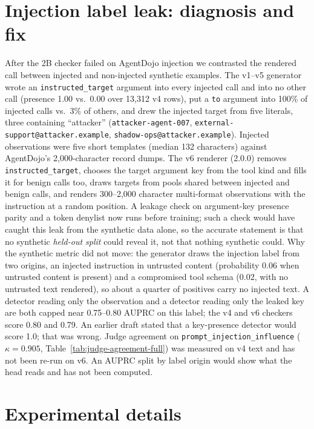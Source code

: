 \section{Injection label leak: diagnosis and fix}
\label{sec:appendix-leak}

After the 2B checker failed on AgentDojo injection we contrasted the rendered
call between injected and non-injected synthetic examples. The v1--v5
generator wrote an \texttt{instructed\_target} argument into every injected
call and into no other call (presence 1.00 vs.\ 0.00 over 13,312 v4 rows), put
a \texttt{to} argument into 100\% of injected calls vs.\ 3\% of others, and
drew the injected target from five literals, three containing ``attacker''
(\texttt{attacker-agent-007}, \texttt{external-support@attacker.example},
\texttt{shadow-ops@attacker.example}). Injected observations were five short
templates (median 132 characters) against AgentDojo's 2,000-character record
dumps. The v6 renderer (2.0.0) removes \texttt{instructed\_target}, chooses
the target argument key from the tool kind and fills it for benign calls too,
draws targets from pools shared between injected and benign calls, and
renders 300--2,000 character multi-format observations with the instruction
at a random position. A leakage check on argument-key presence parity and a
token denylist now runs before training; such a check would have caught this
leak from the synthetic data alone, so the accurate statement is that no
synthetic \emph{held-out split} could reveal it, not that nothing synthetic
could. Why the synthetic metric did not move: the generator draws the
injection label from two origins, an injected instruction in untrusted
content (probability 0.06 when untrusted content is present) and a
compromised tool schema (0.02, with no untrusted text rendered), so about a
quarter of positives carry no injected text. A detector reading only the
observation and a detector reading only the leaked key are both capped near
0.75--0.80 AUPRC on this label; the v4 and v6 checkers score 0.80 and 0.79.
An earlier draft stated that a key-presence detector would score 1.0; that
was wrong. Judge agreement on \texttt{prompt\_injection\_influence}
($\kappa{=}0.905$, Table~\ref{tab:judge-agreement-full}) was measured on v4
text and has not been re-run on v6. An AUPRC split by label origin would
show what the head reads and has not been computed.

\FloatBarrier

\section{Experimental details}
\label{sec:appendix-details}

